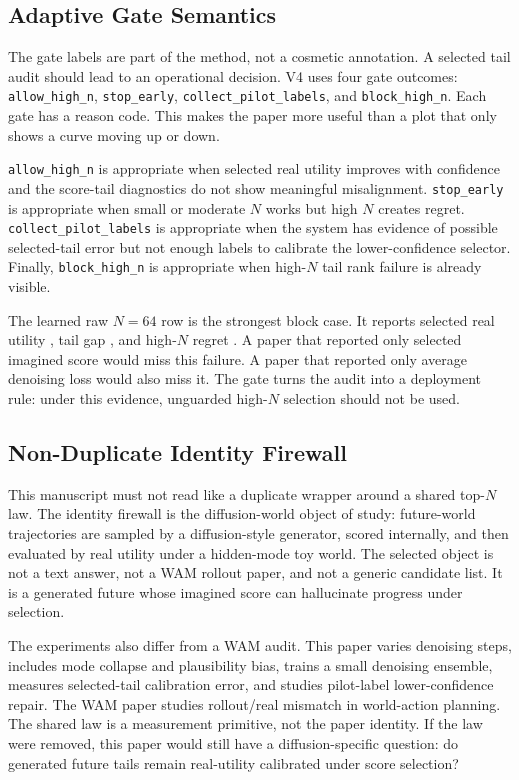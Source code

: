 \documentclass{article}
\begin{document}
\subsection{Adaptive Gate Semantics}
\label{app:v4-gate-semantics}

The gate labels are part of the method, not a cosmetic annotation. A selected
tail audit should lead to an operational decision. V4 uses four gate outcomes:
\texttt{allow\_high\_n}, \texttt{stop\_early},
\texttt{collect\_pilot\_labels}, and \texttt{block\_high\_n}. Each gate has a
reason code. This makes the paper more useful than a plot that only shows a
curve moving up or down.

\texttt{allow\_high\_n} is appropriate when selected real utility improves
with confidence and the score-tail diagnostics do not show meaningful
misalignment. \texttt{stop\_early} is appropriate when small or moderate $N$
works but high $N$ creates regret. \texttt{collect\_pilot\_labels} is
appropriate when the system has evidence of possible selected-tail error but
not enough labels to calibrate the lower-confidence selector. Finally,
\texttt{block\_high\_n} is appropriate when high-$N$ tail rank failure is
already visible.

The learned raw $N=64$ row is the strongest block case. It reports selected
real utility \VFourDWMLearnedRawReal{}, tail gap
\VFourDWMLearnedRawTailGap{}, and high-$N$ regret
\VFourDWMLearnedRawRegret{}. A paper that reported only selected imagined
score would miss this failure. A paper that reported only average denoising
loss would also miss it. The gate turns the audit into a deployment rule:
under this evidence, unguarded high-$N$ selection should not be used.

\subsection{Non-Duplicate Identity Firewall}
\label{app:v4-identity-firewall}

This manuscript must not read like a duplicate wrapper around a shared
top-$N$ law. The identity firewall is the diffusion-world object of study:
future-world trajectories are sampled by a diffusion-style generator, scored
internally, and then evaluated by real utility under a hidden-mode toy world.
The selected object is not a text answer, not a WAM rollout paper, and not a
generic candidate list. It is a generated future whose imagined score can
hallucinate progress under selection.

The experiments also differ from a WAM audit. This paper varies denoising
steps, includes mode collapse and plausibility bias, trains a small denoising
ensemble, measures selected-tail calibration error, and studies pilot-label
lower-confidence repair. The WAM paper studies rollout/real mismatch in
world-action planning. The shared law is a measurement primitive, not the
paper identity. If the law were removed, this paper would still have a
diffusion-specific question: do generated future tails remain real-utility
calibrated under score selection?
\end{document}
